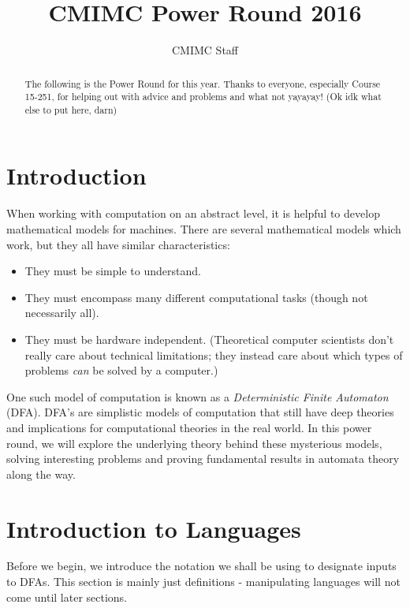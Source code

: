 \documentclass[11pt]{article}
\title{CMIMC Power Round 2016}
\author{CMIMC Staff}
\begin{document}
\maketitle

\begin{abstract}
The following is the Power Round for this year.  Thanks to everyone, especially Course 15-251, for helping out with advice and problems and what not yayayay!  (Ok idk what else to put here, darn)
\end{abstract}

\newpage

\section{Introduction}

When working with computation on an abstract level, it is helpful to develop mathematical models for machines.  There are several mathematical models which work, but they all have similar characteristics:

\begin{itemize}

\item They must be simple to understand.

\item They must encompass many different computational tasks (though not necessarily all).

\item They must be hardware independent.  (Theoretical computer scientists don't really care about technical limitations; they instead care about which types of problems \textit{can} be solved by a computer.)

\end{itemize}

One such model of computation is known as a \textit{Deterministic Finite Automaton} (DFA).  DFA's are simplistic models of computation that still have deep theories and implications for computational theories in the real world.  In this power round, we will explore the underlying theory behind these mysterious models, solving interesting problems and proving fundamental results in automata theory along the way.

\section{Introduction to Languages}

Before we begin, we introduce the notation we shall be using to designate inputs to DFAs.  This section is mainly just definitions - manipulating languages will not come until later sections.
\end{document}
